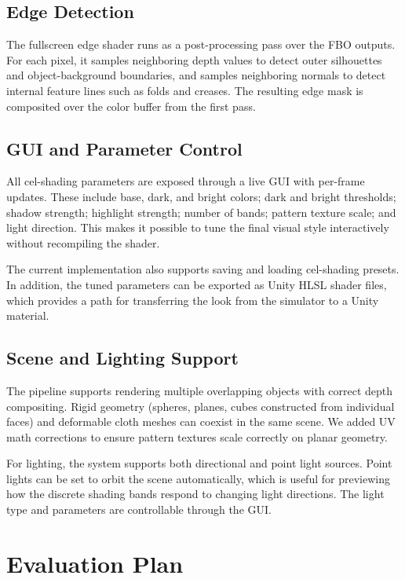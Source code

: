 \documentclass[acmtog,screen]{acmart}
\begin{document}
\subsection{Edge Detection}

The fullscreen edge shader runs as a post-processing pass over the FBO outputs. For each pixel, it samples neighboring depth values to detect outer silhouettes and object-background boundaries, and samples neighboring normals to detect internal feature lines such as folds and creases. The resulting edge mask is composited over the color buffer from the first pass.

\subsection{GUI and Parameter Control}

All cel-shading parameters are exposed through a live GUI with per-frame updates. These include base, dark, and bright colors; dark and bright thresholds; shadow strength; highlight strength; number of bands; pattern texture scale; and light direction. This makes it possible to tune the final visual style interactively without recompiling the shader.

The current implementation also supports saving and loading cel-shading presets. In addition, the tuned parameters can be exported as Unity HLSL shader files, which provides a path for transferring the look from the simulator to a Unity material.

\subsection{Scene and Lighting Support}

The pipeline supports rendering multiple overlapping objects with correct depth compositing. Rigid geometry (spheres, planes, cubes constructed from individual faces) and deformable cloth meshes can coexist in the same scene. We added UV math corrections to ensure pattern textures scale correctly on planar geometry.

For lighting, the system supports both directional and point light sources. Point lights can be set to orbit the scene automatically, which is useful for previewing how the discrete shading bands respond to changing light directions. The light type and parameters are controllable through the GUI.

\section{Evaluation Plan}
\end{document}
